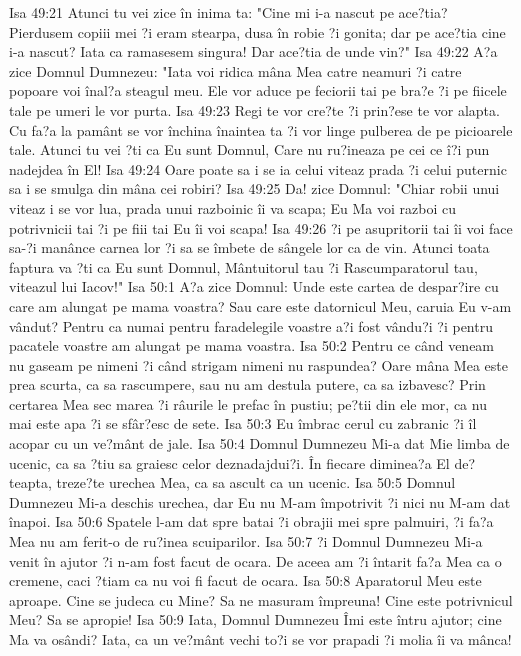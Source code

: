 Isa 49:21  Atunci tu vei zice în inima ta: "Cine mi i-a nascut pe ace?tia? Pierdusem copiii mei ?i eram stearpa, dusa în robie ?i gonita; dar pe ace?tia cine i-a nascut? Iata ca ramasesem singura! Dar ace?tia de unde vin?"
Isa 49:22  A?a zice Domnul Dumnezeu: "Iata voi ridica mâna Mea catre neamuri ?i catre popoare voi înal?a steagul meu. Ele vor aduce pe feciorii tai pe bra?e ?i pe fiicele tale pe umeri le vor purta.
Isa 49:23  Regi te vor cre?te ?i prin?ese te vor alapta. Cu fa?a la pamânt se vor închina înaintea ta ?i vor linge pulberea de pe picioarele tale. Atunci tu vei ?ti ca Eu sunt Domnul, Care nu ru?ineaza pe cei ce î?i pun nadejdea în El!
Isa 49:24  Oare poate sa i se ia celui viteaz prada ?i celui puternic sa i se smulga din mâna cei robiri?
Isa 49:25  Da! zice Domnul: "Chiar robii unui viteaz i se vor lua, prada unui razboinic îi va scapa; Eu Ma voi razboi cu potrivnicii tai ?i pe fiii tai Eu îi voi scapa!
Isa 49:26  ?i pe asupritorii tai îi voi face sa-?i manânce carnea lor ?i sa se îmbete de sângele lor ca de vin. Atunci toata faptura va ?ti ca Eu sunt Domnul, Mântuitorul tau ?i Rascumparatorul tau, viteazul lui Iacov!"
Isa 50:1  A?a zice Domnul: Unde este cartea de despar?ire cu care am alungat pe mama voastra? Sau care este datornicul Meu, caruia Eu v-am vândut? Pentru ca numai pentru faradelegile voastre a?i fost vându?i ?i pentru pacatele voastre am alungat pe mama voastra.
Isa 50:2  Pentru ce când veneam nu gaseam pe nimeni ?i când strigam nimeni nu raspundea? Oare mâna Mea este prea scurta, ca sa rascumpere, sau nu am destula putere, ca sa izbavesc? Prin certarea Mea sec marea ?i râurile le prefac în pustiu; pe?tii din ele mor, ca nu mai este apa ?i se sfâr?esc de sete.
Isa 50:3  Eu îmbrac cerul cu zabranic ?i îl acopar cu un ve?mânt de jale.
Isa 50:4  Domnul Dumnezeu Mi-a dat Mie limba de ucenic, ca sa ?tiu sa graiesc celor deznadajdui?i. În fiecare diminea?a El de?teapta, treze?te urechea Mea, ca sa ascult ca un ucenic.
Isa 50:5  Domnul Dumnezeu Mi-a deschis urechea, dar Eu nu M-am împotrivit ?i nici nu M-am dat înapoi.
Isa 50:6  Spatele l-am dat spre batai ?i obrajii mei spre palmuiri, ?i fa?a Mea nu am ferit-o de ru?inea scuiparilor.
Isa 50:7  ?i Domnul Dumnezeu Mi-a venit în ajutor ?i n-am fost facut de ocara. De aceea am ?i întarit fa?a Mea ca o cremene, caci ?tiam ca nu voi fi facut de ocara.
Isa 50:8  Aparatorul Meu este aproape. Cine se judeca cu Mine? Sa ne masuram împreuna! Cine este potrivnicul Meu? Sa se apropie!
Isa 50:9  Iata, Domnul Dumnezeu Îmi este întru ajutor; cine Ma va osândi? Iata, ca un ve?mânt vechi to?i se vor prapadi ?i molia îi va mânca!
